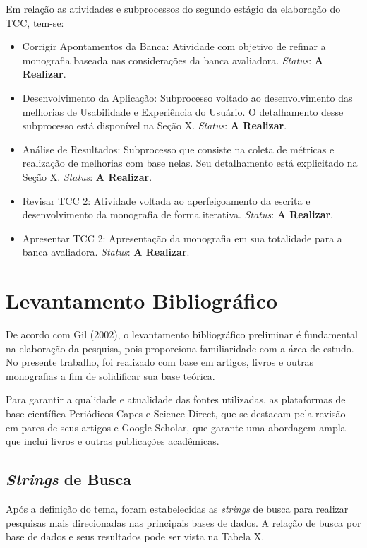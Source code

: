 Em relação as atividades e subprocessos do segundo estágio da elaboração do TCC, tem-se:

\begin{itemize}
	\item Corrigir Apontamentos da Banca: Atividade com objetivo de refinar a monografia baseada nas considerações da banca avaliadora. \textit{Status}: \textbf{A Realizar}.
	\item Desenvolvimento da Aplicação: Subprocesso voltado ao desenvolvimento das melhorias de Usabilidade e Experiência do Usuário. O detalhamento desse subprocesso está disponível na Seção X. \textit{Status}: \textbf{A Realizar}.
	\item Análise de Resultados: Subprocesso que consiste na coleta de métricas e realização de melhorias com base nelas. Seu detalhamento está explicitado na Seção X. \textit{Status}: \textbf{A Realizar}.
	\item Revisar TCC 2: Atividade voltada ao aperfeiçoamento da escrita e desenvolvimento da monografia de forma iterativa. \textit{Status}: \textbf{A Realizar}.
	\item Apresentar TCC 2: Apresentação da monografia em sua totalidade para a banca avaliadora. \textit{Status}: \textbf{A Realizar}.
\end{itemize}

\section{Levantamento Bibliográfico}
\label{sec:Levantamento Bibliografico}
De acordo com Gil (2002), o levantamento bibliográfico preliminar é fundamental na elaboração da pesquisa, pois proporciona familiaridade com a área de estudo. No presente trabalho, foi realizado com base em artigos, livros e outras monografias a fim de solidificar sua base teórica.

Para garantir a qualidade e atualidade das fontes utilizadas, as plataformas de base científica Periódicos Capes e Science Direct, que se destacam pela revisão em pares de seus artigos e Google Scholar, que garante uma abordagem ampla que inclui livros e outras publicações acadêmicas. 

\subsection{\textit{Strings} de Busca}
\label{sec:Strings de Busca}
Após a definição do tema, foram estabelecidas as \textit{strings} de busca para realizar pesquisas mais direcionadas nas principais bases de dados. A relação de busca por base de dados e seus resultados pode ser vista na Tabela X.

